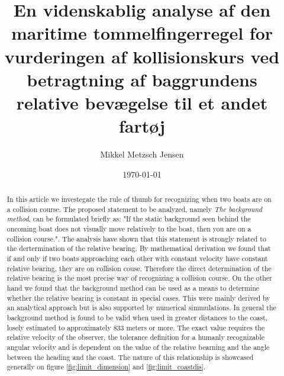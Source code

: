 \documentclass[%
 reprint,
nofootinbib,
aps,
]{revtex4-1}
\begin{document}
\title{En videnskablig analyse af den maritime tommelfingerregel for vurderingen af kollisionskurs ved betragtning af baggrundens relative bevægelse til et andet fartøj}
\author{Mikkel Metzsch Jensen}

\date{\today}


\begin{abstract}
  In this article we investegate the rule of thumb for recognizing when two boats are on a collision course. The proposed statement to be analyzed, namely \textit{The background method}, can be formulated briefly as: "If the static background seen behind the oncoming boat does not visually move relatively to the boat, then you are on a collision course.". The analysis have shown that this statement is strongly related to the dertermination of the relative bearing. By mathematical derivation we found that if and only if two boats approaching each other with constant velocity have constant relative bearing, they are on collision couse. Therefore the direct determination of the relative bearing is the most precise way of recognizing a collision course. On the other hand we found that the background method can be used as a means to determine whether the relative bearing is constant in special cases. This were mainly derived by an analytical approach but is also supported by numerical simmulations. In general the background method is found to be valid when used in greater distances to the coast, losely estimated to approximately 833 meters or more. The exact value requires the relative velocity of the observer, the tolerance definition for a humanly recognizable angular velocity and is dependent on the value of the relative bearning and the angle between the heading and the coast. The nature of this relationship is showcased generally on figure \ref{fig:limit_dimension} and \ref{fig:limit_coastdis}.
\end{abstract}


\maketitle
\end{document}
